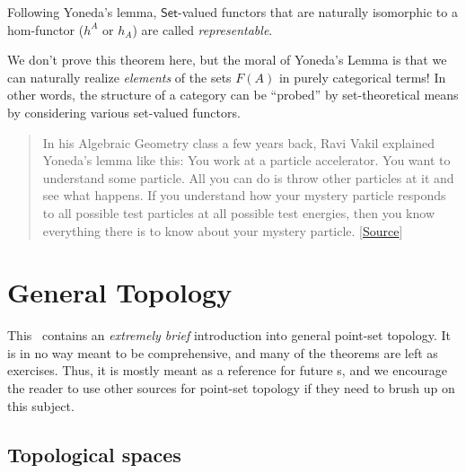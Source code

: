 \begin{defn}
    Following Yoneda's lemma, $\mathsf{Set}$-valued functors that are naturally isomorphic to a hom-functor ($h^A$ or $h_A$) are called \emph{representable}.
\end{defn}
\begin{rem}
    We don't prove this theorem here, but the moral of Yoneda's Lemma
    is that we can naturally realize \emph{elements} of the sets
    $F(A)$ in purely categorical terms! In other words, the structure of a category can be ``probed'' by set-theoretical means by considering various set-valued functors.
\end{rem}
\begin{quote}
    \small In his Algebraic Geometry class a few years back, Ravi Vakil
    explained Yoneda's lemma like this: You work at a particle accelerator.
    You want to understand some particle. All you can do is throw other
    particles at it and see what happens. If you understand how your mystery
    particle responds to all possible test particles at all possible test
    energies, then you know everything there is to know about your mystery
    particle. {[}\href{https://mathoverflow.net/a/3223/22773}{Source}{]}
\end{quote}

\clearpage
\chapter{General Topology}

This \chap\ contains an \emph{extremely brief} introduction into general point-set topology. It is in no way meant to be comprehensive, and many of the theorems are left as exercises. Thus, it is mostly meant as a reference for future \chap s, and we encourage the reader to use other sources for point-set topology if they need to brush up on this subject.


\section{Topological spaces}

